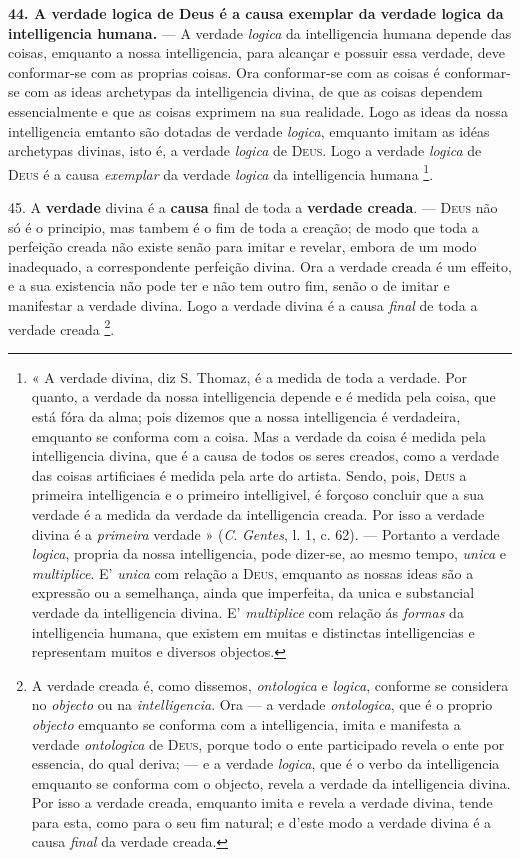 \textbf{44. A verdade logica de Deus é a causa exemplar da verdade logica da intelligencia humana.} --- A verdade \emph{logica} da intelligencia humana depende das coisas, emquanto a nossa intelligencia, para alcançar e possuir essa verdade, deve conformar-se com as proprias coisas. Ora conformar-se com as coisas é conformar-se com as ideas archetypas da intelligencia divina, de que as coisas dependem essencialmente e que as coisas exprimem na sua realidade. Logo as ideas da nossa intelligencia emtanto   são dotadas de verdade \emph{logica}, emquanto imitam as idéas archetypas divinas, isto é, a verdade \emph{logica} de \textsc{Deus}. Logo a verdade \emph{logica} de \textsc{Deus} é a causa \emph{exemplar} da verdade \emph{logica} da intelligencia humana \footnote{« A verdade divina, diz S. Thomaz, é a medida de toda a verdade. Por quanto, a verdade da nossa intelligencia depende e é medida pela coisa, que está fóra da alma; pois dizemos que a nossa intelligencia é verdadeira, emquanto se conforma com a coisa. Mas a verdade da coisa é medida pela intelligencia divina, que é a causa de todos os seres creados, como a verdade das coisas artificiaes é medida pela arte do artista. Sendo, pois, \textsc{Deus} a primeira intelligencia e o primeiro intelligivel, é forçoso concluir que a sua verdade é a medida da verdade da intelligencia creada. Por isso a verdade divina é a \emph{primeira} verdade » (\emph{C}. \emph{Gentes}, l. 1, c. 62). --- Portanto a verdade \emph{logica}, propria da nossa intelligencia, pode dizer-se, ao mesmo tempo, \emph{unica} e \emph{multiplice}. E' \emph{unica} com relação a \textsc{Deus}, emquanto as nossas ideas são a expressão ou a semelhança, ainda que imperfeita, da unica e substancial verdade da intelligencia divina. E' \emph{multiplice} com relação ás \emph{formas} da intelligencia humana, que existem em muitas e distinctas intelligencias e representam muitos e diversos objectos.}.

45. A \textbf{verdade} divina é a \textbf{causa} final de toda a \textbf{verdade creada}. --- \textsc{Deus} não só é o principio, mas tambem é o fim de toda a creação; de modo que toda a perfeição creada não existe senão para imitar e revelar, embora de um modo inadequado, a correspondente perfeição divina. Ora a verdade creada é um effeito, e a sua existencia não pode ter e não tem outro fim, senão o de imitar e manifestar a verdade divina. Logo a verdade divina é a causa \emph{final} de toda a verdade creada \footnote{A verdade creada é, como dissemos, \emph{ontologica} e \emph{logica}, conforme se considera no \emph{objecto} ou na \emph{intelligencia}. Ora --- a verdade \emph{ontologica}, que é o proprio \emph{objecto} emquanto se conforma com a intelligencia, imita e manifesta a verdade \emph{ontologica} de \textsc{Deus}, porque todo o ente participado revela o ente por essencia, do qual deriva; --- e a verdade \emph{logica}, que é o verbo da intelligencia emquanto se conforma com o objecto, revela a verdade da intelligencia divina. Por isso a verdade creada, emquanto imita e revela a verdade divina, tende para esta, como para o seu fim natural; e d'este modo a verdade divina é a causa \emph{final} da verdade creada.}.

